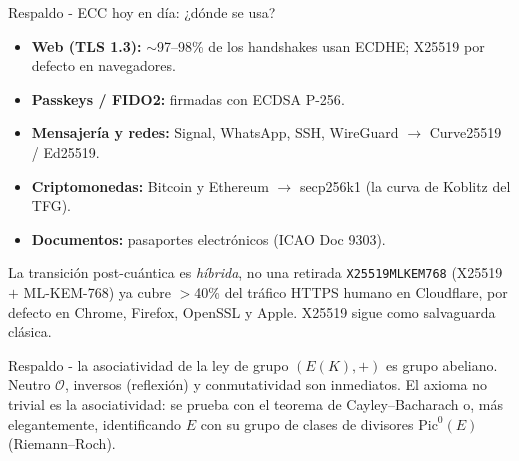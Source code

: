 \documentclass[aspectratio=169,11pt]{beamer}
\begin{document}
\begin{frame}[noframenumbering]{Respaldo - ECC hoy en día: ¿dónde se usa?}
  \footnotesize
  \begin{itemize}\footnotesize
    \item \textbf{Web (TLS 1.3):} $\sim$97--98\% de los handshakes usan ECDHE; \alert{X25519}
      por defecto en navegadores.
    \item \textbf{Passkeys / FIDO2:} firmadas con \alert{ECDSA P-256}.
    \item \textbf{Mensajería y redes:} Signal, WhatsApp, SSH, WireGuard $\to$
      \alert{Curve25519 / Ed25519}.
    \item \textbf{Criptomonedas:} Bitcoin y Ethereum $\to$ \alert{secp256k1} (la curva de
      Koblitz del TFG).
    \item \textbf{Documentos:} pasaportes electrónicos (ICAO Doc 9303).
  \end{itemize}
  \vspace{0.5ex}
  \begin{alertblock}{La transición post-cuántica es \emph{híbrida}, no una retirada}
    \scriptsize \texttt{X25519MLKEM768} (X25519 $+$ ML-KEM-768) ya cubre $>$40\% del tráfico
    HTTPS humano en Cloudflare, por defecto en Chrome, Firefox, OpenSSL y Apple. X25519 sigue
    como \alert{salvaguarda clásica}.
  \end{alertblock}
\end{frame}

\begin{frame}[noframenumbering]{Respaldo - la asociatividad de la ley de grupo}
  \footnotesize
  $(E(K),+)$ es grupo abeliano. Neutro $\mathcal{O}$, inversos (reflexión) y conmutatividad
  son inmediatos. El axioma no trivial es la \alert{asociatividad}: se prueba con el teorema
  de Cayley--Bacharach o, más elegantemente, identificando $E$ con su grupo de clases de
  divisores $\mathrm{Pic}^0(E)$ (Riemann--Roch).
\end{frame}
\end{document}
